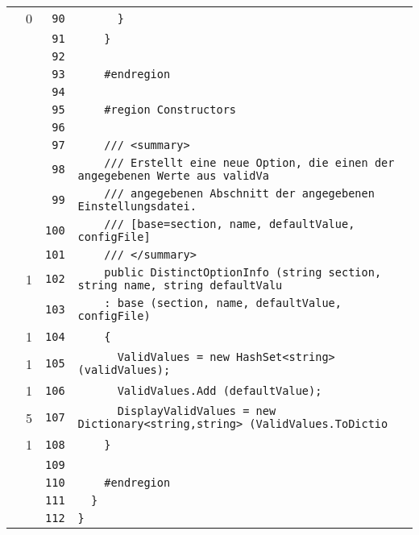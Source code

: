 \documentclass[a4paper,10pt]{article}
\begin{document}
\begin{longtable}[l]{lrrl}
\cellcolor{red} & 0 & \verb~90~ & \verb~      }~\\
\cellcolor{gray} &  & \verb~91~ & \verb~    }~\\
\cellcolor{gray} &  & \verb~92~ & \verb~~\\
\cellcolor{gray} &  & \verb~93~ & \verb~    #endregion~\\
\cellcolor{gray} &  & \verb~94~ & \verb~~\\
\cellcolor{gray} &  & \verb~95~ & \verb~    #region Constructors~\\
\cellcolor{gray} &  & \verb~96~ & \verb~~\\
\cellcolor{gray} &  & \verb~97~ & \verb~    /// <summary>~\\
\cellcolor{gray} &  & \verb~98~ & \verb~    /// Erstellt eine neue Option, die einen der angegebenen Werte aus validVa~\\
\cellcolor{gray} &  & \verb~99~ & \verb~    /// angegebenen Abschnitt der angegebenen Einstellungsdatei.~\\
\cellcolor{gray} &  & \verb~100~ & \verb~    /// [base=section, name, defaultValue, configFile]~\\
\cellcolor{gray} &  & \verb~101~ & \verb~    /// </summary>~\\
\cellcolor{green} & 1 & \verb~102~ & \verb~    public DistinctOptionInfo (string section, string name, string defaultValu~\\
\cellcolor{gray} &  & \verb~103~ & \verb~    : base (section, name, defaultValue, configFile)~\\
\cellcolor{green} & 1 & \verb~104~ & \verb~    {~\\
\cellcolor{green} & 1 & \verb~105~ & \verb~      ValidValues = new HashSet<string> (validValues);~\\
\cellcolor{green} & 1 & \verb~106~ & \verb~      ValidValues.Add (defaultValue);~\\
\cellcolor{green} & 5 & \verb~107~ & \verb~      DisplayValidValues = new Dictionary<string,string> (ValidValues.ToDictio~\\
\cellcolor{green} & 1 & \verb~108~ & \verb~    }~\\
\cellcolor{gray} &  & \verb~109~ & \verb~~\\
\cellcolor{gray} &  & \verb~110~ & \verb~    #endregion~\\
\cellcolor{gray} &  & \verb~111~ & \verb~  }~\\
\cellcolor{gray} &  & \verb~112~ & \verb~}~\\
\end{longtable}
\newpage
\end{document}

